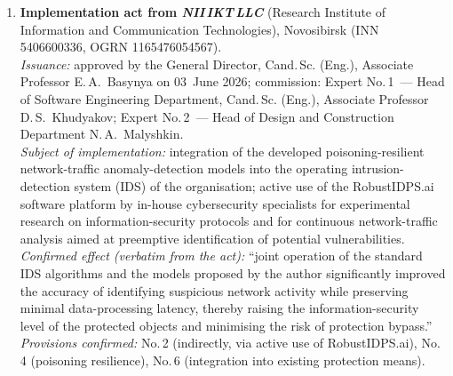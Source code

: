 \documentclass[11pt,a4paper]{article}
\begin{document}
\begin{enumerate}[leftmargin=*, itemsep=0.5em]

\item \textbf{Implementation act from \emph{NII\,IKT\,LLC}} (Research Institute of Information and Communication Technologies), Novosibirsk (INN 5406600336, OGRN 1165476054567). \\
\textit{Issuance:} approved by the General Director, Cand.\,Sc. (Eng.), Associate Professor E.\,A.~Basynya on 03~June 2026; commission: Expert No.\,1~--- Head of Software Engineering Department, Cand.\,Sc. (Eng.), Associate Professor D.\,S.~Khudyakov; Expert No.\,2~--- Head of Design and Construction Department N.\,A.~Malyshkin. \\
\textit{Subject of implementation:} integration of the developed poisoning-resilient network-traffic anomaly-detection models into the operating intrusion-detection system (IDS) of the organisation; active use of the RobustIDPS.ai software platform by in-house cybersecurity specialists for experimental research on information-security protocols and for continuous network-traffic analysis aimed at preemptive identification of potential vulnerabilities. \\
\textit{Confirmed effect (verbatim from the act):} ``joint operation of the standard IDS algorithms and the models proposed by the author significantly improved the accuracy of identifying suspicious network activity while preserving minimal data-processing latency, thereby raising the information-security level of the protected objects and minimising the risk of protection bypass.'' \\
\textit{Provisions confirmed:} No.\,2 (indirectly, via active use of RobustIDPS.ai), No.\,4 (poisoning resilience), No.\,6 (integration into existing protection means).


\end{enumerate}
\end{document}

